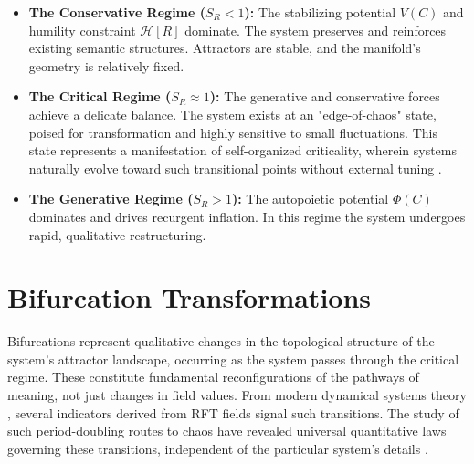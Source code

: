 \begin{itemize}

    \item \textbf{The Conservative Regime (\(S_R < 1\)):} The stabilizing potential \(V(C)\) and humility constraint \(\mathcal{H}[R]\) dominate. The system preserves and reinforces existing semantic structures. Attractors are stable, and the manifold's geometry is relatively fixed.

    \item \textbf{The Critical Regime (\(S_R \approx 1\)):} The generative and conservative forces achieve a delicate balance. The system exists at an "edge-of-chaos" state, poised for transformation and highly sensitive to small fluctuations. This state represents a manifestation of self-organized criticality, wherein systems naturally evolve toward such transitional points without external tuning \autocite{BakTangWiesenfeld1987, Kauffman1993}.

    \item \textbf{The Generative Regime (\(S_R > 1\)):} The autopoietic potential \(\Phi(C)\) dominates and drives recurgent inflation. In this regime the system undergoes rapid, qualitative restructuring.

\end{itemize}


\section{Bifurcation Transformations}
\label{sec:bifurcation_transformations}

Bifurcations represent qualitative changes in the topological structure of the system's attractor landscape, occurring as the system passes through the critical regime. These constitute fundamental reconfigurations of the pathways of meaning, not just changes in field values. From modern dynamical systems theory \autocite{Poincare1892, Lorenz1963, Smale1967, RuelleTakens1971, GuckenheimerHolmes1983, Kuznetsov2004, Strogatz2014}, several indicators derived from RFT fields signal such transitions. The study of such period-doubling routes to chaos have revealed universal quantitative laws governing these transitions, independent of the particular system's details \autocite{Feigenbaum1978}.


